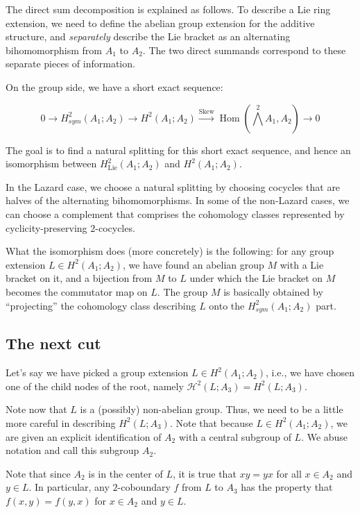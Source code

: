 \documentclass[10pt]{amsart}
\newcommand{\Skew}{\operatorname{Skew}}
\begin{document}
The direct sum decomposition is explained as follows. To describe a
Lie ring extension, we need to define the abelian group extension for
the additive structure, and {\em separately} describe the Lie bracket
as an alternating bihomomorphism from $A_1$ to $A_2$. The two direct
summands correspond to these separate pieces of information.

On the group side, we have a short exact sequence:

$$0 \to H^2_{sym}(A_1;A_2) \to H^2(A_1;A_2) \stackrel{\Skew}{\to} \operatorname{Hom}(\bigwedge^2A_1,A_2) \to 0$$

The goal is to find a natural splitting for this short exact sequence,
and hence an isomorphism between $H^2_{\text{Lie}}(A_1;A_2)$ and
$H^2(A_1;A_2)$.

In the Lazard case, we choose a natural splitting by choosing cocycles
that are halves of the alternating bihomomorphisms. In some of the
non-Lazard cases, we can choose a complement that comprises the
cohomology classes represented by cyclicity-preserving $2$-cocycles.

What the isomorphism does (more concretely) is the following: for any
group extension $L \in H^2(A_1;A_2)$, we have found an abelian group
$M$ with a Lie bracket on it, and a bijection from $M$ to $L$ under
which the Lie bracket on $M$ becomes the commutator map on $L$. The
group $M$ is basically obtained by ``projecting'' the cohomology class
describing $L$ onto the $H^2_{sym}(A_1;A_2)$ part.

\subsection{The next cut}

Let's say we have picked a group extension $L \in H^2(A_1;A_2)$, i.e.,
we have chosen one of the child nodes of the root, namely
$\mathcal{H}^2(L;A_3) = H^2(L;A_3)$. 

Note now that $L$ is a (possibly) non-abelian group. Thus, we need to
be a little more careful in describing $H^2(L;A_3)$. Note that because
$L \in H^2(A_1;A_2)$, we are given an explicit identification of $A_2$
with a central subgroup of $L$. We abuse notation and call this
subgroup $A_2$.

Note that since $A_2$ is in the center of $L$, it is true that $xy =
yx$ for all $x \in A_2$ and $y \in L$. In particular, any
$2$-coboundary $f$ from $L$ to $A_3$ has the property that $f(x,y) =
f(y,x)$ for $x \in A_2$ and $y \in L$.
\end{document}
